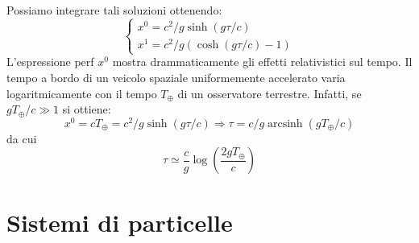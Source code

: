 \documentclass[a4paper,11pt]{book}
\theoremstyle{plain}
\theoremstyle{definition}
\DeclareMathOperator*{\arcsinh}{arcsinh}
\begin{document}
Possiamo integrare tali soluzioni ottenendo:
\[
\begin{cases}
x^0 = c^2/g \sinh(g\tau/c) \\
x^1 = c^2/g (\cosh(g\tau/c) -1)
\end{cases}
\]
L'espressione perf $x^0$ mostra drammaticamente gli effetti relativistici sul tempo. Il tempo a bordo di un veicolo spaziale uniformemente accelerato varia logaritmicamente con il tempo $T_{\oplus}$ di un osservatore terrestre. Infatti, se $gT_{\oplus}/c\gg 1$ si ottiene:
\[
x^0 = cT_{\oplus}=c^2/g \sinh(g\tau/c) \Rightarrow \tau = c/g \arcsinh(gT_{\oplus}/c) 
\]
da cui
\[
\tau \simeq \frac{c}{g}\log\left( \frac{2gT_{\oplus}}{c} \right)
\]
\section{Sistemi di particelle}
\end{document}
